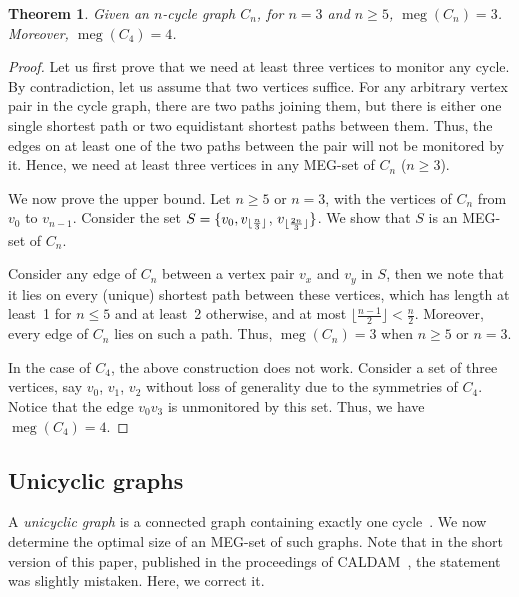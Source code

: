 \documentclass[10pt,a4paper]{article}
\newtheorem{theorem}{Theorem}[section]
\DeclarePairedDelimiter\floor{\lfloor}{\rfloor}
\DeclareMathOperator{\MEG}{meg}
\begin{document}
\begin{theorem}\label{cyclet}
Given an $n$-cycle graph $C_n$, for $n = 3$ and $n \geq 5$, $\MEG(C_n) = 3$. Moreover, $\MEG(C_4) = 4$.
\end{theorem}
\begin{proof}
Let us first prove that we need at least three vertices to monitor any cycle. By contradiction, let us assume that two vertices suffice. For any arbitrary vertex pair in the cycle graph, there are two paths joining them, but there is either one single shortest path or two equidistant shortest paths between them. Thus, the edges on at least one of the two paths between the pair will not be monitored by it. Hence, we need at least three vertices in any MEG-set of $C_n$ ($n\geq 3$).

We now prove the upper bound. Let $n\geq 5$ or $n = 3$, with the vertices of $C_n$ from $v_0$ to $v_{n-1}$. Consider the set $S =\{v_0, v_{\floor{\frac{n}{3}}}$, $v_{\floor{\frac{2n}{3}}}\}$. We show that $S$ is an MEG-set of $C_n$.
 
Consider any edge of $C_n$ between a vertex pair $v_x$ and $v_y$ in $S$, then we note that it lies on every (unique) shortest path between these vertices, which has length at least~1 for $n\leq 5$ and at least~2 otherwise, and at most $\lfloor \frac{n-1}{2}\rfloor<\frac{n}{2}$. 
Moreover, every edge of $C_n$ lies on such a path. Thus, $\MEG(C_n) = 3$ when $n \geq 5$ or $n=3$.

In the case of $C_4$, the above construction does not work. Consider a set of three vertices, say $v_0$, $v_1$, $v_2$ without loss of generality due to the symmetries of $C_4$. Notice that the edge $v_0v_3$ is unmonitored by this set. Thus, we have $\MEG(C_4)=4$.
\end{proof}

\subsection{Unicyclic graphs}

A \emph{unicyclic graph} is a connected graph containing exactly one cycle~\cite{b1}. We now determine the optimal size of an MEG-set of such graphs. Note that in the short version of this paper, published in the proceedings of CALDAM~\cite{CALDAM}, the statement was slightly mistaken. Here, we correct it.
\end{document}
